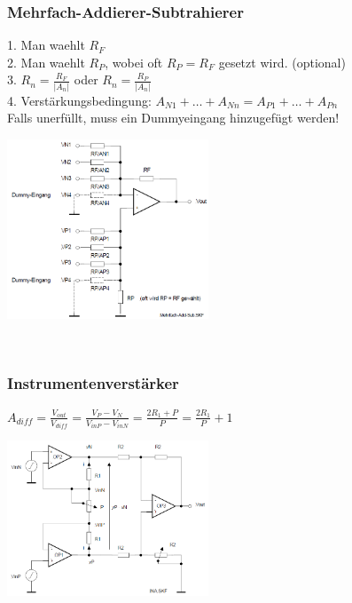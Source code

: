 		\subsubsection{Mehrfach-Addierer-Subtrahierer} 		
		\begin{minipage}[b]{12cm}
		1. Man waehlt $R_{F}$\\
		2. Man waehlt $R_{P}$, wobei oft $R_{P}=R_{F}$ gesetzt wird. (optional)\\
		3. $R_{n}=\frac{R_{F}}{\left|A_{n}\right|}$ oder
			$R_{n}=\frac{R_{P}}{\left|A_{n}\right|}$\\ 
		4. Verstärkungsbedingung: $A_{N1} +
		\ldots + A_{Nn} = A_{P1} + \ldots + A_{Pn}$ \\Falls unerfüllt, muss ein Dummyeingang hinzugefügt werden!
		\end{minipage}
		\begin{minipage}{6cm}
          	\includegraphics[width=6cm]{./bilder/mehrfach-addierer-subtrahierer.png} 
        \end{minipage}\\

		\subsubsection{Instrumentenverstärker}
		\begin{minipage}[b]{12cm}
		$A_{diff}=\frac{V_{out}}{V_{diff}}=\frac{V_{P}-V_{N}}{V_{inP}-V_{inN}}
		=\frac{2R_{1}+P}{P}=\frac{2R_{1}}{P}+1$\\
		\end{minipage}
		\begin{minipage}{6cm}
          	\includegraphics[width=6cm]{./bilder/Instrumentationsverstaerker.png} 
        \end{minipage}\\


